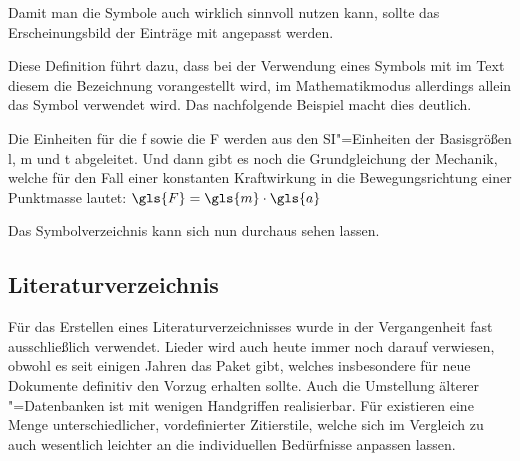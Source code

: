 \documentclass[%
  english,ngerman,%
  geometry=no,DIV=12,automark,%
]{tudscrartcl}
\begin{document}
Damit man die Symbole auch wirklich sinnvoll nutzen kann, sollte das 
Erscheinungsbild der Einträge mit  angepasst werden.
%
\begin{Excerpt}
\end{Excerpt}
%
Diese Definition führt dazu, dass bei der Verwendung eines Symbols mit
 im Text diesem die Bezeichnung vorangestellt 
wird, im Mathematikmodus allerdings allein das Symbol verwendet wird. Das 
nachfolgende Beispiel macht dies deutlich.
%
\begin{Excerpt}
Die Einheiten für die \gls{f} sowie die \gls{F} werden aus den
SI"=Einheiten der Basisgrößen \gls{l}, \gls{m} und \gls{t} abgeleitet.
Und dann gibt es noch die Grundgleichung der Mechanik, welche für den
Fall einer konstanten Kraftwirkung in die Bewegungsrichtung einer
Punktmasse lautet:
$\gls{F} = \gls{m} \cdot \gls{a}$
\end{Excerpt}
%
Das Symbolverzeichnis kann sich nun durchaus sehen lassen.
%
\begin{Excerpt*}
\printsymbols[style=symblongtabu]
\end{Excerpt*}
\begin{quoting}[rightmargin=0pt]
\printsymbols[style=symbtabu]
\end{quoting}


\subsection{Literaturverzeichnis}
\label{sec:biblatex}
Für das Erstellen eines Literaturverzeichnisses wurde in der Vergangenheit fast 
ausschließlich  verwendet. Lieder wird auch heute immer noch 
darauf verwiesen, obwohl es seit einigen Jahren das Paket  
gibt, welches insbesondere für neue Dokumente definitiv den Vorzug erhalten 
sollte. Auch die Umstellung älterer "=Datenbanken ist mit 
wenigen Handgriffen realisierbar. Für  existieren eine Menge 
unterschiedlicher, vordefinierter Zitierstile, welche sich im Vergleich zu 
 auch wesentlich leichter an die individuellen Bedürfnisse 
anpassen lassen.
\end{document}
